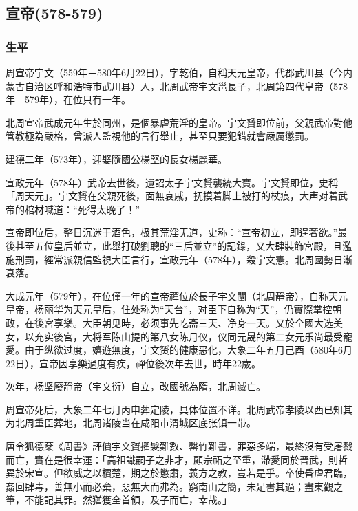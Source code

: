 
\subsection{宣帝\tiny(578-579)}

\subsubsection{生平}

周宣帝宇文（559年－580年6月22日），字乾伯，自稱天元皇帝，代郡武川县（今内蒙古自治区呼和浩特市武川县）人，北周武帝宇文邕長子，北周第四代皇帝（578年－579年），在位只有一年。

北周宣帝武成元年生於同州，是個暴虐荒淫的皇帝。宇文贇即位前，父親武帝對他管教極為嚴格，曾派人監視他的言行舉止，甚至只要犯錯就會嚴厲懲罰。

建德二年（573年），迎娶隨國公楊堅的長女楊麗華。

宣政元年（578年）武帝去世後，遺詔太子宇文贇襲統大寶。宇文贇即位，史稱「周天元」。宇文贇在父親死後，面無哀戚，抚摸着脚上被打的杖痕，大声对着武帝的棺材喊道：“死得太晚了！”

宣帝即位后，整日沉迷于酒色，极其荒淫无道，史称：“宣帝初立，即逞奢欲。”最後甚至五位皇后並立，此舉打破劉聰的“三后並立”的記錄，又大肆裝飾宮殿，且濫施刑罰，經常派親信監視大臣言行，宣政元年（578年），殺宇文憲。北周國勢日漸衰落。

大成元年（579年），在位僅一年的宣帝禪位於長子宇文闡（北周靜帝），自称天元皇帝，杨丽华为天元皇后，住处称为“天台”，对臣下自称为“天”，仍實際掌控朝政，在後宮享樂。大臣朝见時，必须事先吃斋三天、净身一天。又於全國大选美女，以充实後宮，大将军陈山提的第八女陈月仪，仪同元晟的第二女元乐尚最受寵愛。由于纵欲过度，嬉遊無度，宇文赟的健康恶化，大象二年五月己酉（580年6月22日），宣帝因享樂過度有疾，禪位後次年去世，時年22歲。

次年，杨坚廢靜帝（宇文衍）自立，改國號為隋，北周滅亡。

周宣帝死后，大象二年七月丙申葬定陵，具体位置不详。北周武帝孝陵以西已知其为北周重臣葬地，北周诸陵当在咸阳市渭城区底张镇一带。

唐令狐德棻《周書》評價宇文贇擢髮難數、罄竹難書，罪惡多端，最終沒有受屠戮而亡，實在是很幸運：「高祖識嗣子之非才，顧宗祏之至重，滯愛同於晉武，則哲異於宋宣。但欲威之以檟楚，期之於懲肅，義方之教，豈若是乎。卒使昏虐君臨，姦回肆毒，善無小而必棄，惡無大而弗為。窮南山之簡，未足書其過；盡東觀之筆，不能記其罪。然猶獲全首領，及子而亡，幸哉。」

